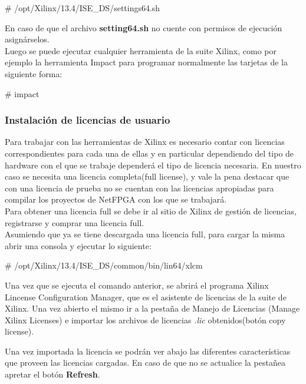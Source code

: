 \begin{bash}
# /opt/Xilinx/13.4/ISE_DS/settings64.sh
\end{bash}

En caso de que el archivo \textbf{setting64.sh} no cuente con permisos de ejecución asignárselos.\\ 

Luego se puede ejecutar cualquier herramienta de la suite Xilinx, como por ejemplo la herramienta Impact para programar normalmente las tarjetas de la siguiente forma:\\

\begin{bash}
# impact
\end{bash}

\subsubsection{Instalación de licencias de usuario}
Para trabajar con las herramientas de Xilinx es necesario contar con licencias correspondientes para cada una de ellas y en particular dependiendo del tipo de hardware con el que se trabaje dependerá el tipo de licencia necesaria. En nuestro caso se necesita una licencia completa(full license), y vale la pena destacar que con una licencia de prueba no se cuentan con las licencias apropiadas para compilar los proyectos de NetFPGA con los que se trabajar\'a.\\

Para obtener una licencia full se debe ir al sitio de Xilinx de gestión de licencias, registrarse y comprar una licencia full.\\

Asumiendo que ya se tiene descargada una licencia full, para cargar la misma abrir una consola y ejecutar lo siguiente:\\

\begin{bash}
# /opt/Xilinx/13.4/ISE_DS/common/bin/lin64/xlcm
\end{bash}

Una vez que se ejecuta el comando anterior, se abrirá el programa  Xilinx Lincense Configuration Manager, que es el asistente de licencias de la suite de Xilinx. Una vez abierto el mismo ir a la pestaña de Manejo de Licencias (Manage Xilinx Licenses) e importar los archivos de licencias \emph{.lic} obtenidos(botón copy license).

Una vez importada la licencia se podrán ver abajo las diferentes características que proveen las licencias cargadas. En caso de que no se actualice la pestañea apretar el botón \textbf{Refresh}.


